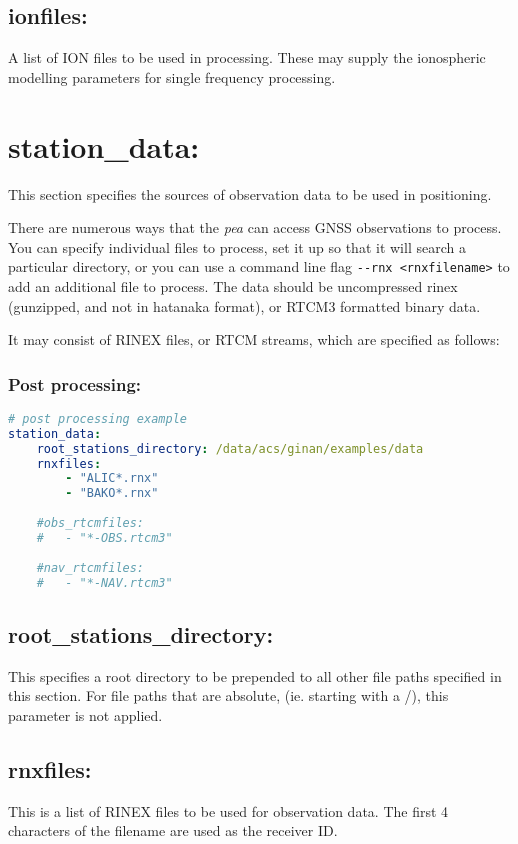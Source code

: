 \subsection*{ionfiles:}
A list of ION files to be used in processing. These may supply the ionospheric modelling parameters for single frequency processing.






\section{station\_data:}
This section specifies the sources of observation data to be used in positioning.


There are numerous ways that the \emph{pea} can access GNSS observations to process. 
You can specify individual files to process, set it up so that it will search a particular directory, or you can use a command line flag \lstinline{--rnx <rnxfilename>} to add an additional file to process. 
The data should be uncompressed rinex (gunzipped, and not in hatanaka format), or RTCM3 formatted binary data.


It may consist of RINEX files, or RTCM streams, which are specified as follows:
\subsubsection{Post processing:}

\begin{lstlisting}[language=yaml,caption=station\_data:]
# post processing example
station_data:
	root_stations_directory: /data/acs/ginan/examples/data
	rnxfiles:
		- "ALIC*.rnx"
		- "BAKO*.rnx"
		
	#obs_rtcmfiles:
	#	- "*-OBS.rtcm3"
		
	#nav_rtcmfiles:
	#	- "*-NAV.rtcm3"
\end{lstlisting}


\subsection*{root\_stations\_directory:}
This specifies a root directory to be prepended to all other file paths specified in this section. For file paths that are absolute, (ie. starting with a /), this parameter is not applied.

\subsection*{rnxfiles:}
This is a list of RINEX files to be used for observation data. The first 4 characters of the filename are used as the receiver ID.

